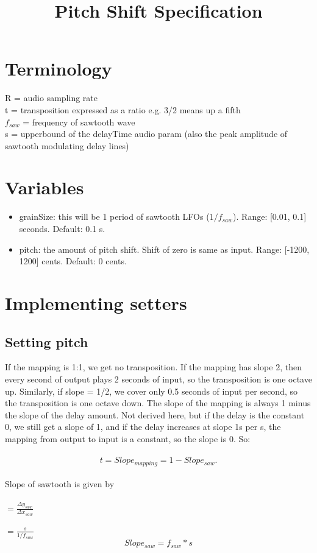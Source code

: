 \documentclass[20pt]{article}
\begin{document}
\title{Pitch Shift Specification}
\maketitle

\section*{Terminology}

R = audio sampling rate\\
t = transposition expressed as a ratio e.g. 3/2 means up a fifth\\
$f_{saw}$ = frequency of sawtooth wave\\
s = upperbound of the delayTime audio param (also the peak amplitude of sawtooth modulating delay lines)\\

\section*{Variables}
\begin{itemize}
\item grainSize:  this will be 1 period of sawtooth LFOs ($1/f_{saw}$). Range: [0.01, 0.1] seconds. Default: 0.1 s.
\item pitch: the amount of pitch shift. Shift of zero is same as input. Range: [-1200, 1200] cents. Default: 0 cents.
\end{itemize}

\section*{Implementing setters}
\subsection*{Setting pitch}
If the mapping is 1:1, we get no transposition. If the mapping has slope 2, then every second of output plays 2 seconds of input, so the transposition is one octave up. Similarly, if slope = 1/2, we cover only 0.5 seconds of input per second, so the transposition is one octave down. The slope of the mapping is always 1 minus the slope of the delay amount. Not derived here, but if the delay is the constant 0, we still get a slope of 1, and if the delay increases at slope 1s per s, the mapping from output to input is a constant, so the slope is 0. 
So: \\
\\
\begin{equation}
t = Slope_{mapping} = 1 - Slope_{saw}.
\end{equation}
\\
\newpage
\noindent Slope of sawtooth is given by \\\\
$ = \frac{\Delta y_{saw}}{\Delta x_{saw}}$\\
\\
$ = \frac{s}{1 / f_{saw}}$
\begin{equation}
Slope_{saw} = f_{saw} * s
\end{equation}
\end{document}

